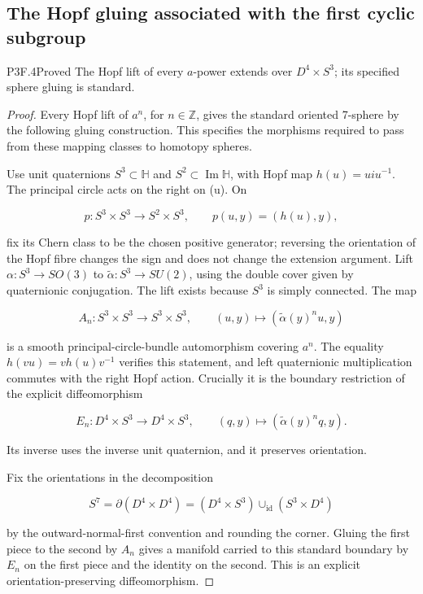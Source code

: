 \subsection{The Hopf gluing associated with the first cyclic subgroup}
\begin{statement}{P3F.4}{Proved}
The Hopf lift of every $a$-power extends over $D^4\times S^3$; its specified sphere gluing is standard.
\end{statement}
\begin{proof}
Every Hopf lift of \(a^n\), for \(n\in\mathbb Z\), gives the standard oriented 7-sphere by the following gluing construction. This specifies the morphisms required to pass from these mapping classes to homotopy spheres.

Use unit quaternions \(S^3\subset\mathbb H\) and \(S^2\subset\operatorname{Im}\mathbb H\), with Hopf map \(h(u)=uiu^{-1}\). The principal circle acts on the right on (u). On

\[
 p:S^3\times S^3\longrightarrow S^2\times S^3,
 \qquad p(u,y)=(h(u),y),
\]

fix its Chern class to be the chosen positive generator; reversing the orientation of the Hopf fibre changes the sign and does not change the extension argument. Lift \(\alpha:S^3\to SO(3)\) to \(\widetilde\alpha:S^3\to SU(2)\), using the double cover given by quaternionic conjugation. The lift exists because \(S^3\) is simply connected. The map

\[
 A_n:S^3\times S^3\to S^3\times S^3,
 \qquad (u,y)\longmapsto(\widetilde\alpha(y)^n u,y)
\]

is a smooth principal-circle-bundle automorphism covering \(a^n\). The equality \(h(vu)=v h(u)v^{-1}\) verifies this statement, and left quaternionic multiplication commutes with the right Hopf action. Crucially it is the boundary restriction of the explicit diffeomorphism

\[
 E_n:D^4\times S^3\longrightarrow D^4\times S^3,
 \qquad (q,y)\longmapsto(\widetilde\alpha(y)^n q,y). \tag{P3F.4.1}
\]

Its inverse uses the inverse unit quaternion, and it preserves orientation.

Fix the orientations in the decomposition

\[
 S^7=\partial(D^4\times D^4)
     =(D^4\times S^3)\cup_{\mathrm{id}}(S^3\times D^4)
\]

by the outward-normal-first convention and rounding the corner. Gluing the first piece to the second by \(A_n\) gives a manifold carried to this standard boundary by \(E_n\) on the first piece and the identity on the second. This is an explicit orientation-preserving diffeomorphism.


\end{proof}
